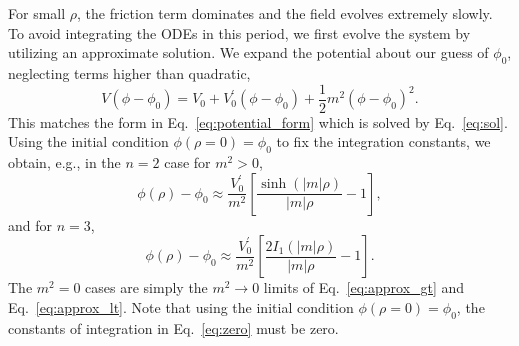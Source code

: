 \documentclass[final,3p,11pt,pdflatex]{elsarticle}
\renewcommand{\tfrac}{\frac}
\renewcommand{\refeq}[1]{Eq.~\ref{#1}}
\begin{document}
For small $\rho$, the friction term dominates and the field evolves extremely slowly.  To avoid integrating the ODEs in this period, we first evolve the system by utilizing an approximate solution.  We expand the potential about our guess of $\phi_0$, neglecting terms higher than quadratic,
\begin{equation}
V(\phi - \phi_0) = V^{\phantom\prime}_0 + V^\prime_0 (\phi - \phi_0) + \tfrac12 m^2 (\phi - \phi_0)^2.
\end{equation}
This matches the form in \refeq{eq:potential_form} which is solved by
\refeq{eq:sol}.  Using the initial condition $\phi(\rho = 0) = \phi_0$ to fix
the integration constants, we obtain, e.g., in the $n=2$ case for $m^2 > 0$,
\begin{equation}\label{eq:approx_gt}
  \phi(\rho) - \phi_0 \approx \frac{V^\prime_0}{m^2} \left[\frac{\sinh(|m|\rho)}
    {|m|\rho} - 1\right],
\end{equation}
and for $n = 3$,
\begin{equation}\label{eq:approx_lt}
  \phi(\rho) - \phi_0 \approx \frac{V^\prime_0}{m^2} \left[\frac{2 I_1(|m|\rho)}
    {|m|\rho} - 1\right].
\end{equation}
The $m^2 = 0$ cases are simply the $m^2\to0$ limits of \refeq{eq:approx_gt} and
\refeq{eq:approx_lt}.  Note that using the initial condition
$\phi(\rho = 0) = \phi_0$, the constants of integration in \refeq{eq:zero}
must be zero.
\end{document}
